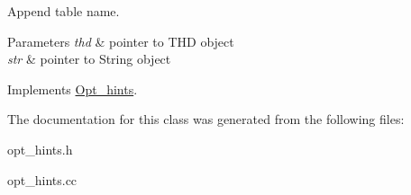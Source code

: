 Append table name.


\begin{DoxyParams}{Parameters}
{\em thd} & pointer to T\+HD object \\
\hline
{\em str} & pointer to String object \\
\hline
\end{DoxyParams}


Implements \mbox{\hyperlink{classOpt__hints}{Opt\+\_\+hints}}.



The documentation for this class was generated from the following files\+:\begin{DoxyCompactItemize}
\item 
opt\+\_\+hints.\+h\item 
opt\+\_\+hints.\+cc\end{DoxyCompactItemize}
